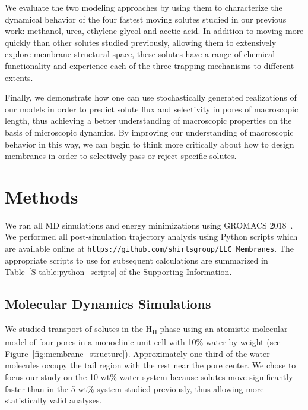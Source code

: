 \documentclass[journal=jctcce,manuscript=article]{achemso}
\begin{document}
  We evaluate the two modeling approaches by using them to characterize the
  dynamical behavior of the four fastest moving solutes studied in our previous
  work: methanol, urea, ethylene glycol and acetic acid. In addition to moving
  more quickly than other solutes studied previously, allowing them to extensively
  explore membrane structural space, these solutes have a range of chemical 
  functionality and experience each of the three trapping mechanisms to different extents.
  
  Finally, we demonstrate how one can use stochastically generated realizations
  of our models in order to predict solute flux and selectivity in pores of 
  macroscopic length, thus achieving a better understanding of macroscopic 
  properties on the basis of microscopic dynamics. By improving our 
  understanding of macroscopic behavior in this way, we can begin to think more
  critically about how to design membranes in order to selectively pass or 
  reject specific solutes.
    
  \section{Methods}
    
  We ran all MD simulations and energy minimizations using GROMACS
  2018~\cite{bekker_gromacs:_1993,berendsen_gromacs:_1995,van_der_spoel_gromacs:_2005,hess_gromacs_2008}.
  We performed all post-simulation trajectory analysis using Python scripts
  which are available online at
  \texttt{https://github.com/shirtsgroup/LLC\_Membranes}. The appropriate
  scripts to use for subsequent calculations are summarized in
  Table~\ref{S-table:python_scripts} of the Supporting Information.
  
  \subsection{Molecular Dynamics Simulations}

  We studied transport of solutes in the H\textsubscript{II} phase using an
  atomistic molecular model of four pores in a monoclinic unit cell with 10\%
  water by weight (see Figure~\ref{fig:membrane_structure}). Approximately one
  third of the water molecules occupy the tail region with the rest near the
  pore center. We chose to focus our study on the 10 wt\% water system because
  solutes move significantly faster than in the 5 wt\% system studied
  previously, thus allowing more statistically valid analyses.
  
\end{document}
